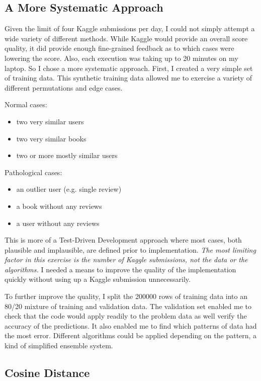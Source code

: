 \documentclass[11pt, oneside]{article}   	%
\begin{document}
\subsection*{A More Systematic Approach}

Given the limit of four Kaggle submissions per day, I could not simply attempt a wide variety of different methods. While Kaggle would provide an overall score quality, it did provide enough fine-grained feedback as to which cases were lowering the score. Also, each execution was taking up to 20 minutes on my laptop. So I chose a more systematic approach. First, I created a very simple set of training data. This synthetic training data allowed me to exercise a variety of different permutations and edge cases.

Normal cases:
\begin{itemize}
  \item two very similar users
  \item two very similar books
  \item two or more mostly similar users
\end{itemize}

Pathological cases:
\begin{itemize}
  \item an outlier user (e.g. single review)
  \item a book without any reviews
  \item a user without any reviews
\end{itemize}

This is more of a Test-Driven Development approach where most cases, both plausible and implausible, are defined prior to implementation. \emph{The most limiting factor in this exercise is the number of Kaggle submissions, not the data or the algorithms.} I needed a means to improve the quality of the implementation quickly without using up a Kaggle submission unnecessarily. 

To further improve the quality, I split the 200000 rows of training data into an 80/20 mixture of training and validation data. The validation set enabled me to check that the code would apply readily to the problem data as well verify the accuracy of the predictions. It also enabled me to find which patterns of data had the most error. Different algorithms could be applied depending on the pattern, a kind of simplified ensemble system.

\subsection*{Cosine Distance}
\end{document}
